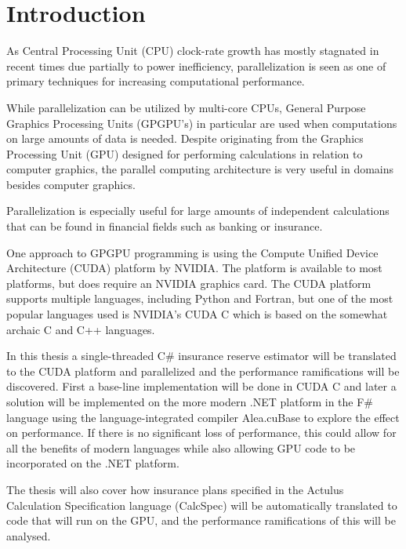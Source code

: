 \section{Introduction}
As Central Processing Unit (CPU) clock-rate growth has mostly stagnated in recent times due partially to power inefficiency\cite{ross2008cpu}, parallelization is seen as one of primary techniques for increasing computational performance.

While parallelization can be utilized by multi-core CPUs, General Purpose Graphics Processing Units (GPGPU's) in particular are used when computations on large amounts of data is needed. Despite originating from the Graphics Processing Unit (GPU) designed for performing calculations in relation to computer graphics, the parallel computing architecture is very useful in domains besides computer graphics.

Parallelization is especially useful for large amounts of independent calculations that can be found in financial fields such as banking or insurance.

One approach to GPGPU programming is using the Compute Unified Device Architecture (CUDA) platform by NVIDIA. The platform is available to most platforms, but does require an NVIDIA graphics card.
The CUDA platform supports multiple languages, including Python and Fortran, but one of the most popular languages used is NVIDIA's CUDA C which is based on the somewhat archaic C and C++ languages.

In this thesis a single-threaded C\# insurance reserve estimator will be translated to the CUDA platform and parallelized and the performance ramifications will be discovered.
First a base-line implementation will be done in CUDA C and later a solution will be implemented on the more modern .NET platform in the F\# language using the language-integrated compiler Alea.cuBase to explore the effect on performance.
If there is no significant loss of performance, this could allow for all the benefits of modern languages while also allowing GPU code to be incorporated on the .NET platform.


The thesis will also cover how insurance plans specified in the Actulus Calculation Specification language (CalcSpec) will be automatically translated to code that will run on the GPU, and the performance ramifications of this will be analysed.

